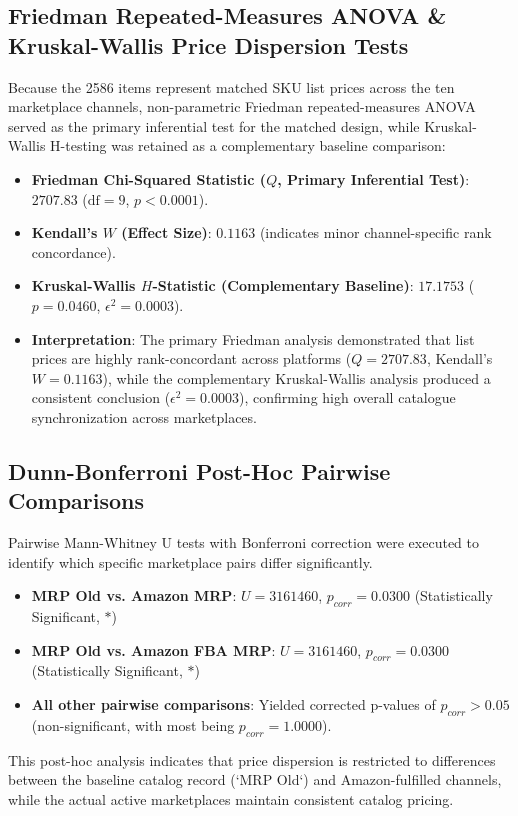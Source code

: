\documentclass[11pt]{article}
\begin{document}
\subsection{Friedman Repeated-Measures ANOVA \& Kruskal-Wallis Price Dispersion Tests}
Because the 2586 items represent matched SKU list prices across the ten marketplace channels, non-parametric Friedman repeated-measures ANOVA served as the primary inferential test for the matched design, while Kruskal-Wallis H-testing was retained as a complementary baseline comparison:
\begin{itemize}
    \item \textbf{Friedman Chi-Squared Statistic ($Q$, Primary Inferential Test)}: $2707.83$ ($\text{df} = 9$, $p < 0.0001$).
    \item \textbf{Kendall's $W$ (Effect Size)}: $0.1163$ (indicates minor channel-specific rank concordance).
    \item \textbf{Kruskal-Wallis $H$-Statistic (Complementary Baseline)}: $17.1753$ ($p = 0.0460$, $\epsilon^2 = 0.0003$).
    \item \textbf{Interpretation}: The primary Friedman analysis demonstrated that list prices are highly rank-concordant across platforms ($Q = 2707.83$, Kendall's $W = 0.1163$), while the complementary Kruskal-Wallis analysis produced a consistent conclusion ($\epsilon^2 = 0.0003$), confirming high overall catalogue synchronization across marketplaces.
\end{itemize}

\subsection{Dunn-Bonferroni Post-Hoc Pairwise Comparisons}
Pairwise Mann-Whitney U tests with Bonferroni correction were executed to identify which specific marketplace pairs differ significantly.
\begin{itemize}
    \item \textbf{MRP Old vs. Amazon MRP}: $U = 3161460$, $p_{corr} = 0.0300$ (Statistically Significant, $*$)
    \item \textbf{MRP Old vs. Amazon FBA MRP}: $U = 3161460$, $p_{corr} = 0.0300$ (Statistically Significant, $*$)
    \item \textbf{All other pairwise comparisons}: Yielded corrected p-values of $p_{corr} > 0.05$ (non-significant, with most being $p_{corr} = 1.0000$).
\end{itemize}
This post-hoc analysis indicates that price dispersion is restricted to differences between the baseline catalog record (`MRP Old`) and Amazon-fulfilled channels, while the actual active marketplaces maintain consistent catalog pricing.
\end{document}
